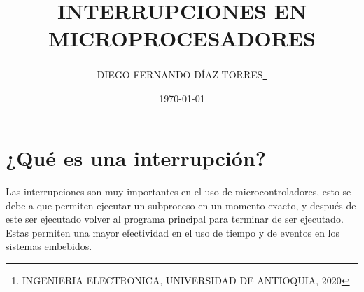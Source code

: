 \documentclass[11pt,letterpaper]{article}
\author{DIEGO FERNANDO DÍAZ TORRES\thanks{INGENIERIA ELECTRONICA, UNIVERSIDAD DE ANTIOQUIA, 2020}}
\title{INTERRUPCIONES EN MICROPROCESADORES}
\date{\today}
\begin{document}
\maketitle










\section*{¿Qué es una interrupción?} %



Las interrupciones son muy importantes en el uso de microcontroladores, esto se debe a que permiten ejecutar un subproceso en un momento exacto, y después de este ser ejecutado volver al programa principal para terminar de ser ejecutado. Estas permiten una mayor efectividad en el uso de tiempo y de eventos en los sistemas embebidos.
\end{document}
